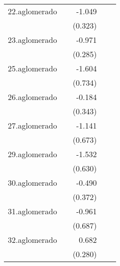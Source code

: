 {\begin{longtable}{l*{4}{D{.}{.}{-1}}}
\addlinespace
22.aglomerado&                     &      -1.049\sym{**} &                     &                     \\
            &                     &     (0.323)         &                     &                     \\
\addlinespace
23.aglomerado&                     &      -0.971\sym{***}&                     &                     \\
            &                     &     (0.285)         &                     &                     \\
\addlinespace
25.aglomerado&                     &      -1.604\sym{*}  &                     &                     \\
            &                     &     (0.734)         &                     &                     \\
\addlinespace
26.aglomerado&                     &      -0.184         &                     &                     \\
            &                     &     (0.343)         &                     &                     \\
\addlinespace
27.aglomerado&                     &      -1.141         &                     &                     \\
            &                     &     (0.673)         &                     &                     \\
\addlinespace
29.aglomerado&                     &      -1.532\sym{*}  &                     &                     \\
            &                     &     (0.630)         &                     &                     \\
\addlinespace
30.aglomerado&                     &      -0.490         &                     &                     \\
            &                     &     (0.372)         &                     &                     \\
\addlinespace
31.aglomerado&                     &      -0.961         &                     &                     \\
            &                     &     (0.687)         &                     &                     \\
\addlinespace
32.aglomerado&                     &       0.682\sym{*}  &                     &                     \\
            &                     &     (0.280)         &                     &                     \\

\end{longtable}}

